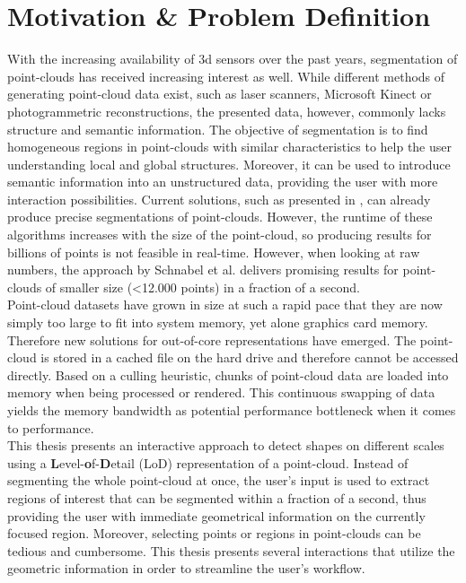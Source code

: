 \section{Motivation \& Problem Definition}

With the increasing availability of 3d sensors over the past years, segmentation of point-clouds has received increasing interest as well. While different methods of generating point-cloud data exist, such as laser scanners, Microsoft Kinect or photogrammetric reconstructions, the presented data, however, commonly lacks structure and semantic information. The objective of segmentation is to find homogeneous regions in point-clouds with similar characteristics to help the user understanding local and global structures. Moreover, it can be used to introduce semantic information into an unstructured data, providing the user with more interaction possibilities. Current solutions, such as presented in \cite{schnabel-2007-efficient}, \cite{schnabel-2007-ransac} can already produce precise segmentations of point-clouds. However, the runtime of these algorithms increases with the size of the point-cloud, so producing results for billions of points is not feasible in real-time. However, when looking at raw numbers, the approach by Schnabel et al. \cite{schnabel-2007-ransac} delivers promising results for point-clouds of smaller size (\textless 12.000 points) in a fraction of a second. 
\\
Point-cloud datasets have grown in size at such a rapid pace that they are now simply too large to fit into system memory, yet alone graphics card memory. Therefore new solutions for out-of-core representations have emerged. The point-cloud is stored in a cached file on the hard drive and therefore cannot be accessed directly. Based on a culling heuristic, chunks of point-cloud data are loaded into memory when being processed or rendered. This continuous swapping of data yields the memory bandwidth as potential performance bottleneck when it comes to performance.
\\
This thesis presents an interactive approach to detect shapes on different scales using a \textbf{L}evel-\textbf{o}f-\textbf{D}etail (LoD) representation of a point-cloud. Instead of segmenting the whole point-cloud at once, the user's input is used to extract regions of interest that can be segmented within a fraction of a second, thus providing the user with immediate geometrical information on the currently focused region. Moreover, selecting points or regions in point-clouds can be tedious and cumbersome. This thesis presents several interactions that utilize the geometric information in order to streamline the user's workflow. 